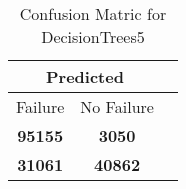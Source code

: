 \begin{table}[] 
\caption{Confusion Matric for DecisionTrees5} 
\label{Table: Prediction Accuracy-DMDDecisionTrees5OnlySunEKF-ignoreReflection-Reflection} 
\centering 
\begin{tabular} 
 {@{}ccc@{}} 
\toprule 
\multicolumn{2}{c}{\textbf{Predicted}}
 \\ \midrule 
\multicolumn{1}{|c|}{Failure} & 
\multicolumn{1}{c|}{No Failure}
 \\ \midrule 
\multicolumn{1}{|c|}{\color{green}\textbf{95155}} & 
\multicolumn{1}{c|}{\color{red}\textbf{3050}}
 \\ \midrule 
\multicolumn{1}{|c|}{\color{red}\textbf{31061}} & 
\multicolumn{1}{c|}{\color{green}\textbf{40862}}
 \\ \bottomrule 
\end{tabular} 
\end{table} 

